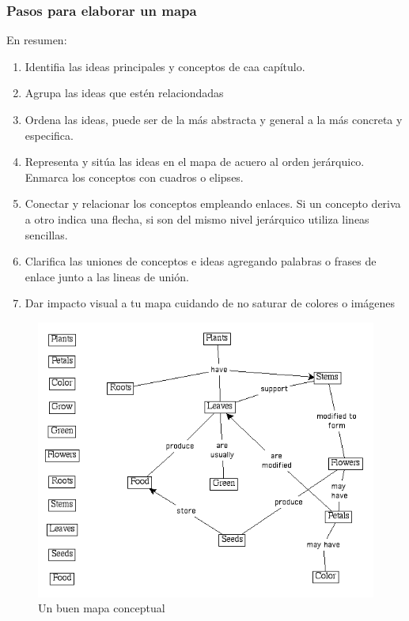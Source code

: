 \documentclass[
	11pt, %
]{beamer}
\begin{document}
\begin{frame}
  \frametitle{Pasos para elaborar un mapa}

  En resumen:\\
  \begin{enumerate}
  \item Identifia las ideas principales y conceptos de caa capítulo.
  \item Agrupa las ideas que estén relaciondadas
  \item Ordena las ideas, puede ser de la más abstracta y general a la más concreta y especifica.
  \item Representa y sitúa las ideas en el mapa de acuero al orden jerárquico. Enmarca los conceptos con cuadros o elipses.
  \item Conectar y relacionar los conceptos empleando enlaces. Si un concepto deriva a otro indica una flecha, si son del mismo nivel jerárquico utiliza lineas sencillas.
  \item Clarifica las uniones de conceptos e ideas agregando palabras o frases de enlace junto a las lineas de unión.
  \item Dar impacto visual a tu mapa cuidando de no saturar de colores o imágenes
  \end{enumerate}

\end{frame}

\begin{frame}
  \begin{figure}[h]
    \includegraphics[width=0.7\linewidth]{plants.png}
    \caption{Un buen mapa conceptual}
    \centering
  \end{figure}
\end{frame}
\end{document}
